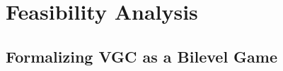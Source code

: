 
\section{Feasibility Analysis}
\label{sec:analysis}

%

\subsection{Formalizing VGC as a Bilevel Game}
\label{subsec:formalization}
